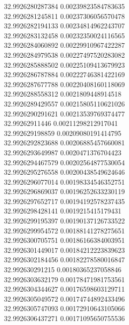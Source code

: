 {32.9926280287384	0.00239823584783635\\
32.9926281245811	0.00237306056570478\\
32.9926282194133	0.00234814962243707\\
32.9926283132458	0.00232350024116565\\
32.9926284060892	0.00229910967422287\\
32.9926284979538	0.00227497520283082\\
32.9926285888502	0.00225109413679923\\
32.9926286787884	0.00222746381422169\\
32.9926287677788	0.00220408160118069\\
32.9926288558312	0.0021809448914518\\
32.9926289429557	0.00215805110621026\\
32.9926290291621	0.00213539769374477\\
32.99262911446	0.00211298212917041\\
32.992629198859	0.00209080191414795\\
32.9926292823688	0.00206885457660081\\
32.9926293649987	0.0020471376704423\\
32.9926294467579	0.00202564877530054\\
32.9926295276558	0.00200438549624646\\
32.9926296077014	0.00198334546352751\\
32.9926296869037	0.00196252633230119\\
32.9926297652717	0.00194192578237435\\
32.9926298428141	0.0019215415179431\\
32.9926299195397	0.00190137126733522\\
32.9926299954572	0.00188141278275651\\
32.9926300705751	0.00186166384003951\\
32.9926301449017	0.00184212223839623\\
32.9926302184456	0.00182278580016847\\
32.992630291215	0.00180365237058846\\
32.9926303632179	0.00178471981753561\\
32.9926304344627	0.00176598603129711\\
32.9926305049572	0.00174744892433496\\
32.9926305747093	0.00172910643105066\\
32.9926306437271	0.00171095650755536\\
}
